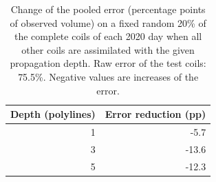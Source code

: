 \begin{table}[htbp]\centering
\caption{Change of the pooled error (percentage points of observed volume) on a fixed random 20\% of the complete coils of each 2020 day when all other coils are assimilated with the given propagation depth. Raw error of the test coils: 75.5\%. Negative values are increases of the error.}
\label{tab:depth}
\begin{tabular}{@{}rr@{}}\toprule
Depth (polylines) & Error reduction (pp) \\\midrule
1 & -5.7 \\
3 & -13.6 \\
5 & -12.3 \\
\bottomrule\end{tabular}\end{table}
